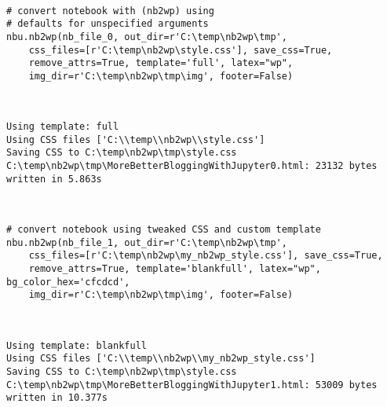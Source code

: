 ~~~~

\begin{verbatim}
# convert notebook with (nb2wp) using
# defaults for unspecified arguments
nbu.nb2wp(nb_file_0, out_dir=r'C:\temp\nb2wp\tmp',
    css_files=[r'C:\temp\nb2wp\style.css'], save_css=True, 
    remove_attrs=True, template='full', latex="wp",
    img_dir=r'C:\temp\nb2wp\tmp\img', footer=False)
\end{verbatim}

~~~~

\begin{verbatim}
Using template: full
Using CSS files ['C:\\temp\\nb2wp\\style.css']
Saving CSS to C:\temp\nb2wp\tmp\style.css
C:\temp\nb2wp\tmp\MoreBetterBloggingWithJupyter0.html: 23132 bytes written in 5.863s
\end{verbatim}

~~~~

\begin{verbatim}
# convert notebook using tweaked CSS and custom template
nbu.nb2wp(nb_file_1, out_dir=r'C:\temp\nb2wp\tmp',
    css_files=[r'C:\temp\nb2wp\my_nb2wp_style.css'], save_css=True, 
    remove_attrs=True, template='blankfull', latex="wp", bg_color_hex='cfcdcd',
    img_dir=r'C:\temp\nb2wp\tmp\img', footer=False)
\end{verbatim}

~~~~

\begin{verbatim}
Using template: blankfull
Using CSS files ['C:\\temp\\nb2wp\\my_nb2wp_style.css']
Saving CSS to C:\temp\nb2wp\tmp\style.css
C:\temp\nb2wp\tmp\MoreBetterBloggingWithJupyter1.html: 53009 bytes written in 10.377s
\end{verbatim}



%
 
 
 
